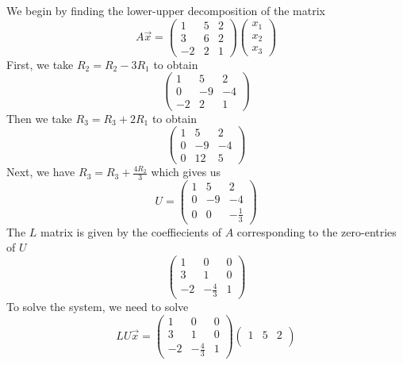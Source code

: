 \begin{solution}
  We begin by finding the lower-upper decomposition of the matrix
  \[
A \vec{x} =
\begin{pmatrix}
                   1 & 5 & 2\\
                   3 & 6 & 2\\
                   -2 & 2 & 1
                 \end{pmatrix}
                 \begin{pmatrix}
                   x_{1}\\
                   x_{2}\\
                   x_{3}
                 \end{pmatrix}
\]
  First, we take \(R_{2} = R_{2} - 3R_{1}\) to obtain
  \[
\begin{pmatrix}
       1 & 5 & 2\\
       0 & -9 & -4\\
       -2 & 2 & 1
     \end{pmatrix}
\]
  Then we take \(R_{3} = R_{3} + 2R_{1}\) to obtain
  \[
\begin{pmatrix}
       1 & 5 & 2\\
       0 & -9 & -4\\
       0 & 12 & 5
     \end{pmatrix}
\]
  Next, we have \(R_{3} = R_{3} + \frac{4R_{2}}{3}\) which gives us
  \[
U =
    \begin{pmatrix}
      1 & 5 & 2\\
      0 & -9 & -4\\
      0 & 0 & -\frac{1}{3}
    \end{pmatrix}
\]
  The \(L\) matrix is given by the coeffiecients of \(A\) corresponding to
  the zero-entries of \(U\)
  \[
\begin{pmatrix}
      1 & 0 & 0\\
      3 & 1 & 0\\
      -2 & -\frac{4}{3} & 1
    \end{pmatrix}
\]
  To solve the system, we need to solve
  \[
LU \vec{x} =
\begin{pmatrix}
                    1 & 0 & 0\\
                    3 & 1 & 0\\
                    -2 & -\frac{4}{3} & 1
                  \end{pmatrix}
                  \begin{pmatrix}
                    1 & 5 & 2\\

\end{pmatrix}\]
\end{solution}
